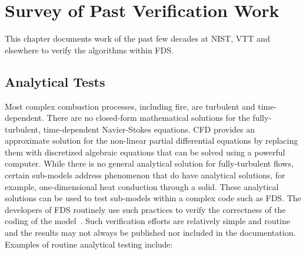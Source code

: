 \documentclass[11pt]{book}
\begin{document}
\chapter{Survey of Past Verification Work}

This chapter documents work of the past few decades at NIST, VTT and elsewhere to verify the algorithms within FDS.




\section{Analytical Tests}

\label{Analytical Tests}

Most complex combustion processes, including fire, are turbulent and time-dependent. There are no closed-form mathematical solutions for the
fully-turbulent, time-dependent Navier-Stokes equations. CFD provides an approximate solution for the non-linear partial differential equations by
replacing them with discretized algebraic equations that can be solved using a powerful computer. While there is no general analytical solution for
fully-turbulent flows, certain sub-models address phenomenon that do have analytical solutions, for example, one-dimensional heat conduction through
a solid. These analytical solutions can be used to test sub-models within a complex code such as FDS. The developers of FDS routinely use such
practices to verify the correctness of the coding of the model~\cite{Mell:1,McGrattan:4}. Such verification efforts are relatively simple and routine
and the results may not always be published nor included in the documentation. Examples of routine analytical testing include:
\end{document}
